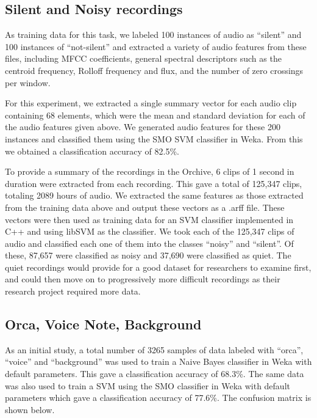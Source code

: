 \subsection{Silent and Noisy recordings}

As training data for this task, we labeled 100 instances of audio as
``silent'' and 100 instances of ``not-silent'' and extracted a variety
of audio features from these files, including MFCC coefficients,
general spectral descriptors such as the centroid frequency, Rolloff
frequency and flux, and the number of zero crossings per window.

For this experiment, we extracted a single summary vector for each
audio clip containing 68 elements, which were the mean and standard
deviation for each of the audio features given above.  We generated
audio features for these 200 instances and classified them using the
SMO SVM classifier in Weka.  From this we obtained a classification
accuracy of 82.5\%.

To provide a summary of the recordings in the Orchive, 6 clips of 1
second in duration were extracted from each recording.  This gave a
total of 125,347 clips, totaling 2089 hours of audio.  We extracted
the same features as those extracted from the training data above and
output these vectors as a .arff file.  These vectors were then used as
training data for an SVM classifier implemented in C++ and using
libSVM \cite{cc01} as the classifier. We took each of the 125,347
clips of audio and classified each one of them into the classes
``noisy'' and ``silent''.  Of these, 87,657 were classified as noisy
and 37,690 were classified as quiet.  The quiet recordings would
provide for a good dataset for researchers to examine first, and could
then move on to progressively more difficult recordings as their
research project required more data.

\subsection{Orca, Voice Note, Background}

As an initial study, a total number of 3265 samples of data labeled
with ``orca'', ``voice'' and ``background'' was used to train a Naive
Bayes classifier in Weka with default parameters.  This gave a
classification accuracy of 68.3\%.  The same data was also used to
train a SVM using the SMO classifier in Weka with default parameters
which gave a classification accuracy of 77.6\%.  The confusion matrix
is shown below.

